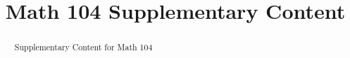 \documentclass{xourse}
\title{Math 104 Supplementary Content}
\begin{document}
\begin{abstract}
  Supplementary Content for Math 104
\end{abstract}
\maketitle

\end{document}
